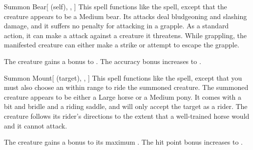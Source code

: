 \lowercase{\hypertarget{spell:Summon Bear}{}}\label{spell:Summon Bear}
\begin{attuneability}[Rank 3]{\hypertarget{spell:Summon Bear}{Summon Bear}}[ (self), , ]
This spell functions like the  spell, except that the creature appears to be a Medium bear.
Its attacks deal bludgeoning and slashing damage, and it suffers no penalty for attacking in a grapple.
As a standard action, it can make a  attack against a creature it threatens.
While grappling, the manifested creature can either make a strike or attempt to escape the grapple.

\rankline
{} The creature gains a  bonus to .
 The accuracy bonus increases to .
\end{attuneability}
\vspace{0.25em}



\lowercase{\hypertarget{spell:Summon Mount}{}}\label{spell:Summon Mount}
\begin{attuneability}[Rank 3]{\hypertarget{spell:Summon Mount}{Summon Mount}}[ (target), , ]
This spell functions like the  spell, except that you must also choose an  within \rngmed range to ride the summoned creature.
The summoned creature appears to be either a Large horse or a Medium pony.
It comes with a bit and bridle and a riding saddle, and will only accept the target as a rider.
The creature follows its rider's directions to the extent that a well-trained horse would and it cannot attack.

\rankline
{} The creature gains a  bonus to its maximum .
 The hit point bonus increases to .
\end{attuneability}
\vspace{0.25em}



